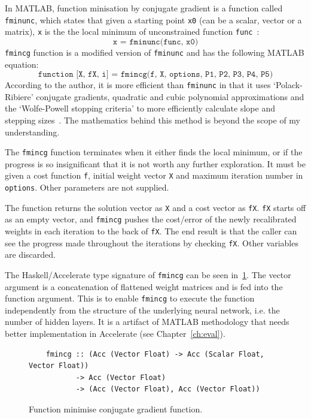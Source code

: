 In MATLAB, function minisation by conjugate gradient is a function called \texttt{fminunc}, which states that given a starting point \texttt{x0} (can be a scalar, vector or a matrix), \texttt{x} is the the local minimum of unconstrained function \texttt{func}~\cite{Mat17}:
$$\texttt{x = fminunc(func, x0)}$$
\texttt{fmincg} function is a modified version of \texttt{fminunc} and has the following MATLAB equation:
$$\texttt{function [X, fX, i] = fmincg(f, X, options, P1, P2, P3, P4, P5)}$$
According to the author, it is more efficient than \texttt{fminunc} in that it uses `Polack-Ribiere' conjugate gradients, quadratic and cubic polynomial approximations and the `Wolfe-Powell stopping criteria' to more efficiently calculate slope and stepping sizes~\cite{Reb13}. The mathematics behind this method is beyond the scope of my understanding.

The \texttt{fmincg} function terminates when it either finds the local minimum, or if the progress is so insignificant that it is not worth any further exploration. It must be given a cost function \texttt{f}, initial weight vector \texttt{X} and maximum iteration number in \texttt{options}. Other parameters are not supplied. 

The function returns the solution vector as \texttt{X} and a cost vector as \texttt{fX}. \texttt{fX} starts off as an empty vector, and \texttt{fmincg} pushes the cost/error of the newly recalibrated weights in each iteration to the back of \texttt{fX}. The end result is that the caller can see the progress made throughout the iterations by checking \texttt{fX}. Other variables are discarded.

The Haskell/Accelerate type signature of \texttt{fmincg} can be seen in~\ref{fig:fmincg}. The vector argument is a concatenation of flattened weight matrices and is fed into the function argument. This is to enable \texttt{fmincg} to execute the function independently from the structure of the underlying neural network, i.e. the number of hidden layers. It is a artifact of MATLAB methodology that needs better implementation in Accelerate (see Chapter~\ref{ch:eval}).

\begin{figure}
	\begin{lstlisting}
	fmincg :: (Acc (Vector Float) -> Acc (Scalar Float, Vector Float))
           -> Acc (Vector Float)
           -> (Acc (Vector Float), Acc (Vector Float))
	\end{lstlisting}
  	\caption{Function minimise conjugate gradient function.}
	\label{fig:fmincg}
\end{figure}

